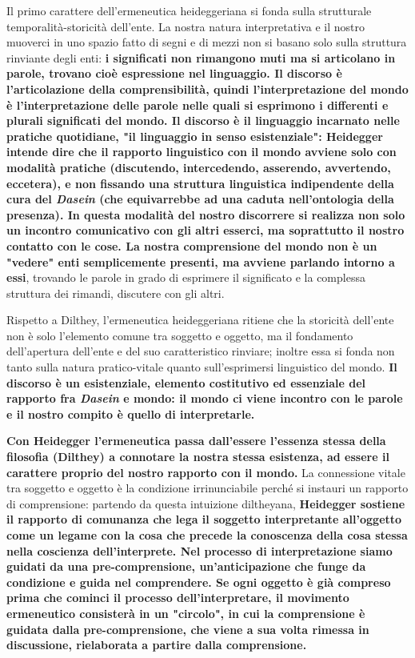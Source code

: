 Il primo carattere dell'ermeneutica heideggeriana si fonda sulla strutturale
temporalità-storicità dell'ente.
La nostra natura interpretativa e il nostro muoverci in uno spazio fatto di segni e
di mezzi non si
basano solo sulla struttura rinviante degli enti:
\textbf{i significati non rimangono muti ma si
articolano in parole, trovano cioè espressione
nel linguaggio.
Il discorso è l'articolazione della comprensibilità,
quindi l'interpretazione del mondo è l'interpretazione delle parole nelle quali si esprimono i differenti e plurali significati del mondo.
Il discorso è il linguaggio incarnato nelle pratiche
quotidiane, "il linguaggio in senso esistenziale": Heidegger intende dire che
il rapporto linguistico con il mondo avviene solo con
modalità pratiche (discutendo, intercedendo, asserendo,
avvertendo, eccetera), e non fissando una struttura
linguistica indipendente della cura del \textit{Dasein}
(che equivarrebbe ad una caduta nell'ontologia
della presenza).
In questa modalità del nostro discorrere si realizza
non solo un incontro comunicativo con gli altri
esserci, ma soprattutto il nostro contatto con le
cose. La nostra comprensione del mondo non
è un "vedere" enti semplicemente presenti, ma avviene
parlando intorno a essi}, trovando le parole in
grado di esprimere il significato e la complessa
struttura dei rimandi, discutere con gli altri.

Rispetto a Dilthey, l'ermeneutica heideggeriana
ritiene che la storicità dell'ente non è solo l'elemento
comune tra soggetto e oggetto, ma  il fondamento
dell'apertura dell'ente e del suo caratteristico
rinviare; inoltre essa si fonda non tanto sulla
natura pratico-vitale quanto sull'esprimersi
linguistico del mondo. 
\textbf{Il discorso è un
esistenziale, elemento costitutivo ed
essenziale del rapporto fra \textit{Dasein} e mondo:
il mondo ci viene incontro con le parole e
il nostro compito è quello di interpretarle.}

\textbf{Con Heidegger l'ermeneutica passa dall'essere
l'essenza stessa della filosofia (Dilthey) a
connotare la nostra stessa esistenza, ad essere
il carattere proprio del nostro rapporto con il
mondo.}
La connessione vitale tra soggetto e oggetto è la
condizione irrinunciabile perché si instauri un
rapporto di comprensione: partendo da questa
intuizione diltheyana,\textbf{ Heidegger sostiene 
il rapporto di comunanza che lega
il soggetto interpretante all'oggetto come
un legame con la cosa che precede la
conoscenza della cosa stessa nella coscienza
dell'interprete. Nel processo di interpretazione
siamo guidati da una pre-comprensione,
un'anticipazione che funge da condizione e guida
nel comprendere.
Se ogni oggetto è già compreso prima che cominci il
processo dell'interpretare, il movimento ermeneutico
consisterà in un "circolo", in cui la comprensione
è guidata dalla pre-comprensione, che viene
a sua volta rimessa in discussione, rielaborata
a partire dalla comprensione.}

